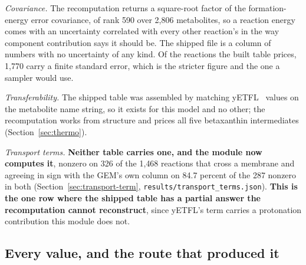 \emph{Covariance.} The recomputation returns a square-root factor of the formation-energy
error covariance, of rank 590 over 2{,}806 metabolites, so a reaction energy comes with an
uncertainty correlated with every other reaction's in the way component contribution says
it should be. The shipped file is a column of numbers with no uncertainty of any kind. Of
the reactions the built table prices, 1{,}770 carry a finite standard error, which is the
stricter figure and the one a sampler would use.

\emph{Transferability.} The shipped table was assembled by matching
yETFL~\cite{oftadehGenomescaleMetabolicModel2021} values on the metabolite name string, so
it exists for this model and no other; the recomputation works from structure and prices
all five betaxanthin intermediates (Section~\ref{sec:thermo}).

\emph{Transport terms.} \textbf{Neither table carries one, and the module now computes it},
nonzero on 326 of the 1{,}468 reactions that cross a membrane and agreeing in sign with the
GEM's own column on 84.7 percent of the 287 nonzero in both
(Section~\ref{sec:transport-term}, \texttt{results/transport\_terms.json}).
\textbf{This is the one row where the shipped table has a partial answer the recomputation
cannot reconstruct}, since yETFL's term carries a protonation contribution this module does
not.

\subsection{Every value, and the route that produced it}
\label{sec:routes}

